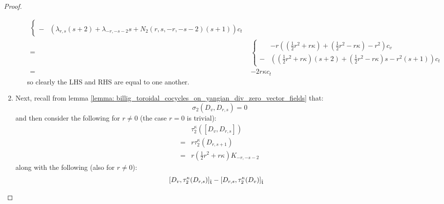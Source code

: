 \begin{proof}
\begin{enumerate}
\begin{enumerate}
$$\begin{aligned}
\begin{cases}
                                        \\
                                        - & \left( \lambda_{r, s} (s + 2) + \lambda_{-r, -s - 2} s + N_2(r, s, -r, -s - 2) (s + 1) \right) c_t
                                    \end{cases}
                                    \\
                                    = &
                                    \begin{cases}
                                        & -r \left( \left( \frac12 r^2 + r \kappa \right) + \left( \frac12 r^2 - r \kappa \right) - r^2\right) c_v
                                        \\
                                        - & \left( \left( \frac12 r^2 + r \kappa \right) (s + 2) + \left( \frac12 r^2 - r \kappa \right) s - r^2 (s + 1) \right) c_t
                                    \end{cases}
                                    \\
                                    = & -2r \kappa c_t
                                \end{aligned}
                            $$
                        so clearly the LHS and RHS are equal to one another.
                    \end{enumerate}
                    \item Next, recall from lemma \ref{lemma: billig_toroidal_cocycles_on_yangian_div_zero_vector_fields} that:
                        $$\sigma_2(D_v, D_{r, s}) = 0$$
                    and then consider the following for $r \not = 0$ (the case $r = 0$ is trivial):
                        $$
                            \begin{aligned}
                                & \tau_2^{\kappa}([D_v, D_{r, s}])
                                \\
                                = & r\tau_2^{\kappa}(D_{r, s + 1})
                                \\
                                = & r \left(\frac12 r^2 + r \kappa \right) K_{-r, -s - 2}
                            \end{aligned}
                        $$
                    along with the following (also for $r \not = 0$):
                        $$
                            \begin{aligned}
                                & [D_v, \tau_2^{\kappa}(D_{r, s})]_{\extendedtoroidal} - [D_{r, s}, \tau_2^{\kappa}(D_v)]_{\extendedtoroidal}

\end{aligned}$$
\end{enumerate}
\end{proof}
